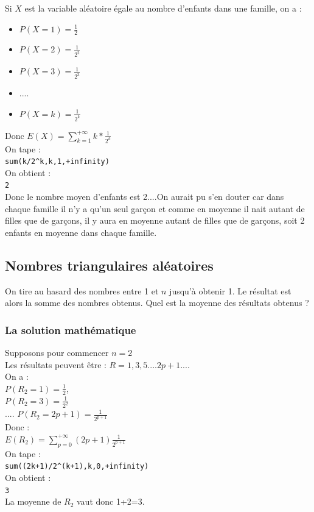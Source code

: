 \documentclass[a4paper,11pt]{book}
\begin{document}
Si $X$ est la variable al\'eatoire \'egale au nombre d'enfants dans une 
famille, on a :
\begin{itemize}
\item $\displaystyle P(X=1)=\frac{1}{2}$
\item $\displaystyle P(X=2)=\frac{1}{2^2}$
\item $\displaystyle P(X=3)=\frac{1}{2^3}$
\item ....
\item $\displaystyle P(X=k)=\frac{1}{2^k}$
\end{itemize}
Donc $\displaystyle E(X)=\sum_{k=1}^{+\infty} k*\frac{1}{2^k}$\\
On tape :\\
{\tt sum(k/2\verb|^|k,k,1,+infinity)}\\
On obtient :\\
{\tt 2}\\
Donc le nombre moyen d'enfants est 2....On aurait pu s'en douter car dans 
chaque famille il n'y a qu'un seul gar\c{c}on et comme en moyenne il nait 
autant de filles que de gar\c{c}ons, il y aura en moyenne autant de filles que 
de gar\c{c}ons, soit 2 enfants en moyenne dans chaque famille.

\subsection{Nombres triangulaires al\'eatoires}
On tire au hasard des nombres entre 1 et $n$ jusqu'\`a obtenir 1. Le 
r\'esultat est alors la somme des nombres obtenus. Quel est la moyenne des 
r\'esultats obtenus ?

\subsubsection{La solution math\'ematique}
Supposons pour commencer $n=2$\\
Les r\'esultats peuvent \^etre : $R=1,3,5....2p+1....$\\
On a :\\
$\displaystyle P(R_2=1)=\frac{1}{2}$,\\
$\displaystyle P(R_2=3)=\frac{1}{2^2}$\\
....
$\displaystyle P(R_2=2p+1)=\frac{1}{2^{p+1}}$\\
Donc :\\
$\displaystyle E(R_2)=\sum_{p=0}^{+\infty} (2p+1)\frac{1}{2^{p+1}}$\\
On tape :\\
{\tt sum((2k+1)/2\verb|^|(k+1),k,0,+infinity)}\\
On obtient :\\
{\tt 3}\\
La moyenne de $R_2$ vaut donc 1+2=3.\\
\end{document}
